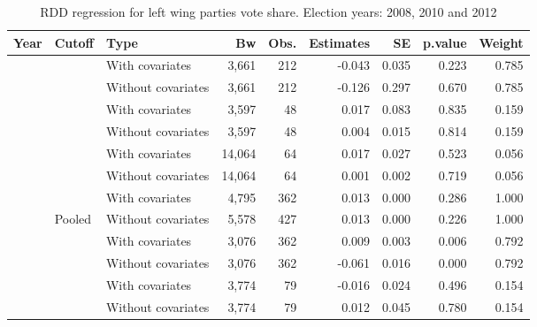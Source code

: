 \documentclass[
  12pt,
]{article}
\begin{document}
\begin{table}[H]

\caption{\label{tab:r.pct.vote}RDD regression for left wing parties vote share. Election years: 2008, 2010 and 2012}
\centering
\begin{tabular}[t]{lllrrrrrr}
\toprule
Year & Cutoff & Type & Bw & Obs. & Estimates & SE & p.value & Weight\\
\midrule
 &  & With covariates & 3,661 & 212 & -0.043 & 0.035 & 0.223 & 0.785\\


 & \multirow{-2}{*}{\raggedright\arraybackslash 20000} & Without covariates & 3,661 & 212 & -0.126 & 0.297 & 0.670 & 0.785\\


 &  & With covariates & 3,597 & 48 & 0.017 & 0.083 & 0.835 & 0.159\\


 & \multirow{-2}{*}{\raggedright\arraybackslash 40000} & Without covariates & 3,597 & 48 & 0.004 & 0.015 & 0.814 & 0.159\\


 &  & With covariates & 14,064 & 64 & 0.017 & 0.027 & 0.523 & 0.056\\


 & \multirow{-2}{*}{\raggedright\arraybackslash 60000} & Without covariates & 14,064 & 64 & 0.001 & 0.002 & 0.719 & 0.056\\


 &  & With covariates & 4,795 & 362 & 0.013 & 0.000 & 0.286 & 1.000\\


\multirow{-8}{*}{\raggedright\arraybackslash 2008} & \multirow{-2}{*}{\raggedright\arraybackslash Pooled} & Without covariates & 5,578 & 427 & 0.013 & 0.000 & 0.226 & 1.000\\

\cmidrule{1-9}
 &  & With covariates & 3,076 & 362 & 0.009 & 0.003 & 0.006 & 0.792\\


 & \multirow{-2}{*}{\raggedright\arraybackslash 20000} & Without covariates & 3,076 & 362 & -0.061 & 0.016 & 0.000 & 0.792\\


 &  & With covariates & 3,774 & 79 & -0.016 & 0.024 & 0.496 & 0.154\\


 & \multirow{-2}{*}{\raggedright\arraybackslash 40000} & Without covariates & 3,774 & 79 & 0.012 & 0.045 & 0.780 & 0.154\\



\end{tabular}
\end{table}
\end{document}

